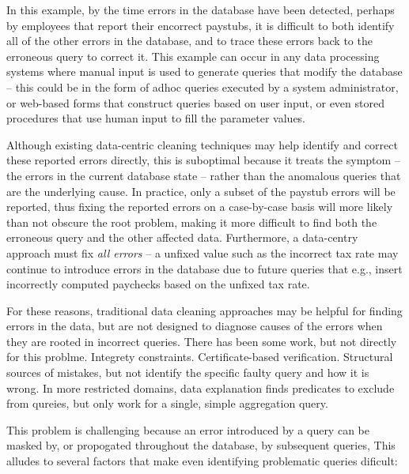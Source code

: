 In this example, by the time errors in the database have been detected, 
perhaps by employees that report their encorrect paystubs, it is difficult 
to both identify all of the other errors in the database, and to trace these errors back to the erroneous query to correct it.
This example can occur in any data processing systems where manual input is used to generate queries that modify the database --
this could be in the form of adhoc queries executed by a system administrator, or web-based forms that construct queries based
on user input, or even stored procedures that use human input to fill the parameter values.

Although existing data-centric cleaning techniques may help identify and correct these reported errors directly, 
this is suboptimal because it treats the symptom -- the errors in the current database state -- rather than the anomalous
queries that are the underlying cause.  In practice, only a subset of the paystub errors will be reported, thus fixing
the reported errors on a case-by-case basis will more likely than not obscure the root problem, making it more difficult to
find both the erroneous query and the other affected data.  
Furthermore, a data-centry approach must fix {\it all errors} -- a unfixed value such as the incorrect tax rate
may continue to introduce errors in the database due to future queries that 
e.g., insert incorrectly computed paychecks based on the unfixed tax rate.

For these reasons, traditional data cleaning approaches may be helpful for finding errors in the data, but are
not designed to diagnose causes of the errors when they are rooted in incorrect queries.
There has been some work, but not directly for this problme.  
Integrety constraints.
Certificate-based verification.
Structural sources of mistakes, but not identify the specific faulty query and how it is wrong.
In more restricted domains, data explanation finds predicates to exclude from qureies, but only work for a single, simple  aggregation query.

This problem is challenging because an error introduced by a query can be masked by, or propogated throughout the database,
by subsequent queries, This alludes to several factors that make even identifying problematic queries dificult:

